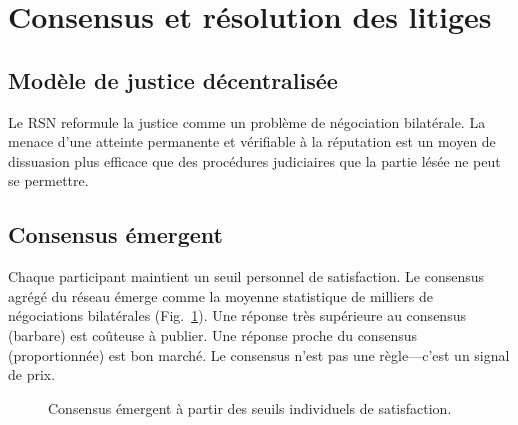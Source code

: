 \documentclass[11pt,a4paper,twocolumn]{article}
\begin{document}
\section{Consensus et résolution des litiges}

\subsection{Modèle de justice décentralisée}

Le RSN reformule la justice comme un problème de négociation bilatérale. La menace d'une atteinte permanente et vérifiable à la réputation est un moyen de dissuasion plus efficace que des procédures judiciaires que la partie lésée ne peut se permettre.

\subsection{Consensus émergent}

Chaque participant maintient un seuil personnel de satisfaction. Le consensus agrégé du réseau émerge comme la moyenne statistique de milliers de négociations bilatérales (Fig.~\ref{fig:consensus}). Une réponse très supérieure au consensus (barbare) est coûteuse à publier. Une réponse proche du consensus (proportionnée) est bon marché. Le consensus n'est pas une règle---c'est un signal de prix.

\begin{figure}[ht]
\centering
{}
\caption{Consensus émergent à partir des seuils individuels de satisfaction.}
\label{fig:consensus}
\end{figure}
\end{document}
